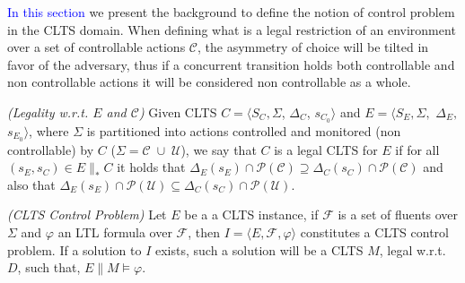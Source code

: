\textcolor{blue}{In this section} we present the background to define the notion of control problem in the CLTS domain.  When defining what is a legal restriction of an environment over a set of controllable actions $\mathcal{C}$, the asymmetry of choice will be tilted in favor of the adversary, thus if a concurrent transition holds both controllable and non controllable actions it will be considered non controllable as a whole.

\begin{definition}
	\label{def:legal_clts} \emph{(Legality w.r.t. $E$ and $\mathcal{C}$)} 
	Given CLTS $C = \langle S_C, \Sigma$, $\Delta_C$, $s_{C_0}\rangle$ and $E = \langle S_E,\Sigma,$ $\Delta_E,$ $s_{E_0}\rangle$, where $\Sigma$ is partitioned into actions controlled and monitored (non controllable) by $C$ ($\Sigma=\mathcal{C} \; \cup \;\mathcal{U}$), we say that $C$ is a legal CLTS for $E$ if for all $(s_E,s_C) \in E \parallel_* C$ it holds that
	$\Delta_{E}(s_E)\cap \mathcal{P}(\mathcal{C}) \supseteq \Delta_{C}(s_C)\cap \mathcal{P}(\mathcal{C})$ and also that  $\Delta_{E}(s_E)\cap \mathcal{P}(\mathcal{U}) \subseteq \Delta_{C}(s_C)\cap \mathcal{P}(\mathcal{U})$.
\end{definition}

\begin{definition}
	\label{def:mixed_control_problem} \emph{(CLTS Control Problem)} 
	Let $E$ be a a CLTS instance, if $\mathcal{F}$ is a set of fluents over $\Sigma$ and $\varphi$ an LTL formula over $\mathcal{F}$, then $I = \langle E, \mathcal{F}, \varphi \rangle$ constitutes a CLTS control problem. If a solution to $I$ exists, such a solution will be a CLTS $M$, legal w.r.t. $D$, such that, $E \parallel M \models \varphi$.
\end{definition}
